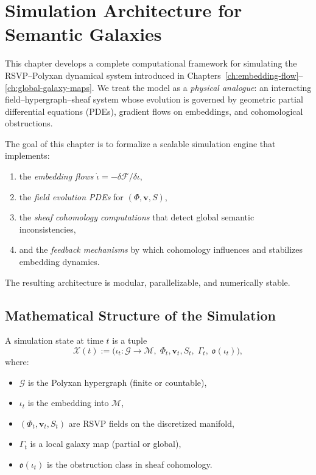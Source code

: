 \chapter{Simulation Architecture for Semantic Galaxies}
\label{ch:simulation-architecture}

This chapter develops a complete computational framework for simulating
the RSVP--Polyxan dynamical system introduced in
Chapters~\ref{ch:embedding-flow}--\ref{ch:global-galaxy-maps}.
We treat the model as a \emph{physical analogue}: 
an interacting field--hypergraph--sheaf system whose evolution is governed
by geometric partial differential equations (PDEs), 
gradient flows on embeddings, and cohomological obstructions.

The goal of this chapter is to formalize a scalable simulation engine
that implements:

\begin{enumerate}
  \item the \emph{embedding flows}
        $\dot\iota = -\delta\mathcal{F}/\delta\iota$,
  \item the \emph{field evolution PDEs} for $(\Phi,\mathbf{v},S)$,
  \item the \emph{sheaf cohomology computations} that detect global semantic inconsistencies,
  \item and the \emph{feedback mechanisms} by which cohomology
        influences and stabilizes embedding dynamics.
\end{enumerate}

The resulting architecture is modular, parallelizable, and numerically stable.


\section{Mathematical Structure of the Simulation}

A simulation state at time $t$ is a tuple
\[
  \mathcal{X}(t)
  :=
  \Big(
    \iota_t : \mathcal{G}\to\mathcal{M},\;
    \Phi_t,\mathbf{v}_t,S_t,\;
    \Gamma_t,\;
    \mathfrak{o}(\iota_t)
  \Big),
\]
where:

\begin{itemize}
  \item $\mathcal{G}$ is the Polyxan hypergraph (finite or countable),
  \item $\iota_t$ is the embedding into $\mathcal{M}$,
  \item $(\Phi_t,\mathbf{v}_t,S_t)$ are RSVP fields on the discretized manifold,
  \item $\Gamma_t$ is a local galaxy map (partial or global),
  \item $\mathfrak{o}(\iota_t)$ is the obstruction class in sheaf cohomology.
\end{itemize}

